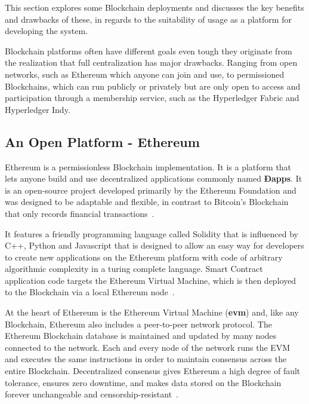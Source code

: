This section  explores some Blockchain deployments and discusses the key benefits and drawbacks of these, in regards to the suitability of usage as a platform
for developing the system.

Blockchain platforms often have different goals even tough they originate from
the realization that full centralization has major drawbacks. Ranging from open
networks, such as Ethereum which anyone can join and use, to permissioned
Blockchains, which can run publicly or privately but are only open to access
and participation through a membership service, such as the Hyperledger Fabric
and Hyperledger Indy.

\subsection{An Open Platform - Ethereum}

Ethereum is a permissionless Blockchain implementation. It is a platform that lets anyone build and use decentralized applications commonly named \textbf{Ðapps}. It is an open-source project developed primarily by the Ethereum Foundation and was designed to be adaptable and flexible, in contrast to Bitcoin's Blockchain that only records financial transactions~\cite{EthereumDocs2018}.

 It features a friendly programming language called Solidity that is influenced by C++, Python and Javascript that is designed to allow an easy way for developers to create new applications on the Ethereum platform with code of arbitrary algorithmic complexity in a turing complete language. Smart Contract application code targets the Ethereum Virtual Machine, which is then
deployed to the Blockchain via a local Ethereum node~\cite{Wood2017,Barclay2017}.

At the heart of Ethereum is the Ethereum Virtual Machine (\textbf{evm}) and, like any Blockchain, Ethereum also includes a peer-to-peer network protocol. The Ethereum Blockchain database is maintained and updated by many nodes connected to the network. Each and every node of the network runs the EVM and executes the same instructions in order to maintain consensus across the entire Blockchain. Decentralized consensus gives Ethereum a high degree of fault tolerance, ensures zero downtime, and makes data stored on the Blockchain forever unchangeable and censorship-resistant~\cite{EthereumDocs2018}.

